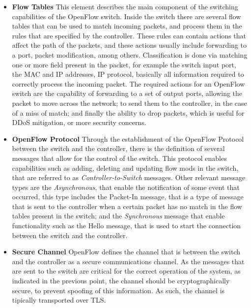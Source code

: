 \begin {enumerate}
\begin {itemize}
    \item \textbf {Flow Tables} This element describes the main component of the switching capabilities of the OpenFlow switch. Inside the switch there are several
        flow tables that can be used to match incoming packets, and process them in the rules that are specified by the controller. These rules can contain actions
        that affect the path of the packets, and these actions usually include forwarding to a port, packet modification, among others. Classification is done via 
        matching one or more field present in the packet, for example the switch input port, the MAC and IP addresses, IP protocol, basically all information
        required to correctly process the incoming packet. The required actions for an OpenFlow switch are the capability of forwarding to a set of output ports,
        allowing the packet to move across the network; to send them to the controller, in the case of a miss of match; and finally the ability to drop packets, 
        which is useful for DDoS mitigation, or more security concerns.
    \item \textbf {OpenFlow Protocol} Through the establishment of the OpenFlow Protocol between the switch and the controller, there is the definition of several
        messages that allow for the control of the switch. This protocol enables capabilities such as adding, deleting and updating flow mods in the switch, that are
        referred to as \textit {Controller-to-Switch} messages. Other relevant message types are the \textit {Asynchronous}, that enable the notification of some
        event that occurred, this type includes the Packet-In message, that is a type of message that is sent to the controller when a certain packet has no match in
        the flow tables present in the switch; and the \textit{ Synchronous} message that enable functionality such as the Hello message, that is used to start the
        connection between the switch and the controller.
    \item \textbf {Secure Channel} OpenFlow defines the channel that is between the switch and the controller as a secure communications channel. As the messages 
        that are sent to the switch are critical for the correct operation of the system, as indicated in the previous point, the channel should be cryptographically
        secure, to prevent spoofing of this information. As such, the channel is tipically transported over TLS.
\end {itemize}


\end{enumerate}
